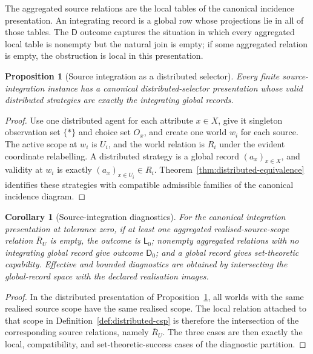 \documentclass[11pt]{article}
\theoremstyle{plain}
\newtheorem{proposition}[theorem]{Proposition}
\newtheorem{corollary}[theorem]{Corollary}
\theoremstyle{definition}
\theoremstyle{remark}
\begin{document}
The aggregated source relations are the local tables of the canonical incidence
presentation. An integrating record is a global row whose projections lie in all
of those tables. The $\mathsf D$ outcome captures the situation in which every
aggregated local table is nonempty but the natural join is empty; if some
aggregated relation is empty, the obstruction is local in this presentation.

\begin{proposition}[Source integration as a distributed selector]
\label{prop:source-integration-distributed}
Every finite source-integration instance has a canonical distributed-selector
presentation whose valid distributed strategies are exactly the integrating
global records.
\end{proposition}

\begin{proof}
Use one distributed agent for each attribute $x\in X$, give it singleton
observation set $\{\ast\}$ and choice set $O_x$, and create one world $w_i$ for
each source. The active scope at $w_i$ is $U_i$, and the world relation is
$R_i$ under the evident coordinate relabelling. A distributed strategy is a
global record $(a_x)_{x\in X}$, and validity at $w_i$ is exactly
$(a_x)_{x\in U_i}\in R_i$. Theorem~\ref{thm:distributed-equivalence} identifies
these strategies with compatible admissible families of the canonical incidence
diagram.
\end{proof}

\begin{corollary}[Source-integration diagnostics]
\label{cor:source-integration-diagnostics}
For the canonical integration presentation at tolerance zero, if at least one
aggregated realised-source-scope relation $\bar R_U$ is empty, the outcome is
$\mathsf L_0$; nonempty aggregated relations with no integrating global record
give outcome
$\mathsf D_0$; and a global record gives set-theoretic capability. Effective and
bounded diagnostics are obtained by intersecting the global-record space with the
declared realisation images.
\end{corollary}

\begin{proof}
In the distributed presentation of Proposition~\ref{prop:source-integration-distributed},
all worlds with the same realised source scope have the same realised scope. The local
relation attached to that scope in Definition~\ref{def:distributed-csp} is
therefore the intersection of the corresponding source relations, namely
$\bar R_U$. The three cases are then exactly the local, compatibility, and
set-theoretic-success cases of the diagnostic partition.
\end{proof}
\end{document}
